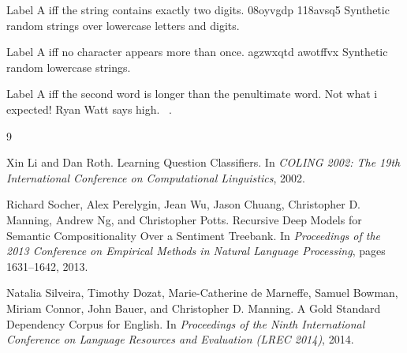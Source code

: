 \documentclass[11pt, letterpaper]{article}
\begin{document}
{Label A iff the string contains exactly two digits.}
{08oyvgdp}
{118avsq5}
{Synthetic random strings over lowercase letters and digits.}

{Label A iff no character appears more than once.}
{agzwxqtd}
{awotffvx}
{Synthetic random lowercase strings.}

{Label A iff the second word is longer than the penultimate word.}
{Not what i expected!}
{Ryan Watt says high.}
{~\cite{silveira-etal-2014}.}

\begin{thebibliography}{9}

Xin Li and Dan Roth.
\newblock Learning Question Classifiers.
\newblock In \emph{COLING 2002: The 19th International Conference on Computational Linguistics}, 2002.

Richard Socher, Alex Perelygin, Jean Wu, Jason Chuang, Christopher D. Manning, Andrew Ng, and Christopher Potts.
\newblock Recursive Deep Models for Semantic Compositionality Over a Sentiment Treebank.
\newblock In \emph{Proceedings of the 2013 Conference on Empirical Methods in Natural Language Processing}, pages 1631--1642, 2013.

Natalia Silveira, Timothy Dozat, Marie-Catherine de Marneffe, Samuel Bowman, Miriam Connor, John Bauer, and Christopher D. Manning.
\newblock A Gold Standard Dependency Corpus for English.
\newblock In \emph{Proceedings of the Ninth International Conference on Language Resources and Evaluation (LREC 2014)}, 2014.

\end{thebibliography}
\end{document}
